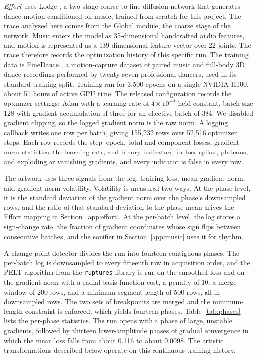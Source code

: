 \emph{Effort} uses Lodge \citep{li2024lodge}, a two-stage coarse-to-fine diffusion network that generates dance motion conditioned on music, trained from scratch for this project.
The trace analyzed here comes from the Global module, the coarse stage of the network.
Music enters the model as 35-dimensional handcrafted audio features, and motion is represented as a 139-dimensional feature vector over 22 joints.
The trace therefore records the optimization history of this specific run.
The training data is FineDance \citep{li2023finedance}, a motion-capture dataset of paired music and full-body 3D dance recordings performed by twenty-seven professional dancers, used in its standard training split.
Training ran for 3,500 epochs on a single NVIDIA H100, about 51 hours of active GPU time.
The released configuration records the optimizer settings: Adan with a learning rate of \(4\times10^{-4}\) held constant, batch size 128 with gradient accumulation of three for an effective batch of 384.
We disabled gradient clipping, so the logged gradient norm is the raw norm.
A logging callback writes one row per batch, giving 155,232 rows over 52,516 optimizer steps.
Each row records the step, epoch, total and component losses, gradient-norm statistics, the learning rate, and binary indicators for loss spikes, plateaus, and exploding or vanishing gradients, and every indicator is false in every row.

The artwork uses three signals from the log: training loss, mean gradient norm, and gradient-norm volatility.
Volatility is measured two ways.
At the phase level, it is the standard deviation of the gradient norm over the phase's downsampled rows, and the ratio of that standard deviation to the phase mean drives the Effort mapping in Section~\ref{app:effort}.
At the per-batch level, the log stores a sign-change rate, the fraction of gradient coordinates whose sign flips between consecutive batches, and the sonifier in Section~\ref{app:music} uses it for rhythm.

A change-point detector divides the run into fourteen contiguous phases.
The per-batch log is downsampled to every fifteenth row in acquisition order, and the PELT algorithm from the \texttt{ruptures} library is run on the smoothed loss and on the gradient norm with a radial-basis-function cost, a penalty of 10, a merge window of 200 rows, and a minimum segment length of 500 rows, all in downsampled rows.
The two sets of breakpoints are merged and the minimum-length constraint is enforced, which yields fourteen phases.
Table~\ref{tab:phases} lists the per-phase statistics.
The run opens with a phase of large, unstable gradients, followed by thirteen lower-amplitude phases of gradual convergence in which the mean loss falls from about 0.116 to about 0.0098.
The artistic transformations described below operate on this continuous training history.

